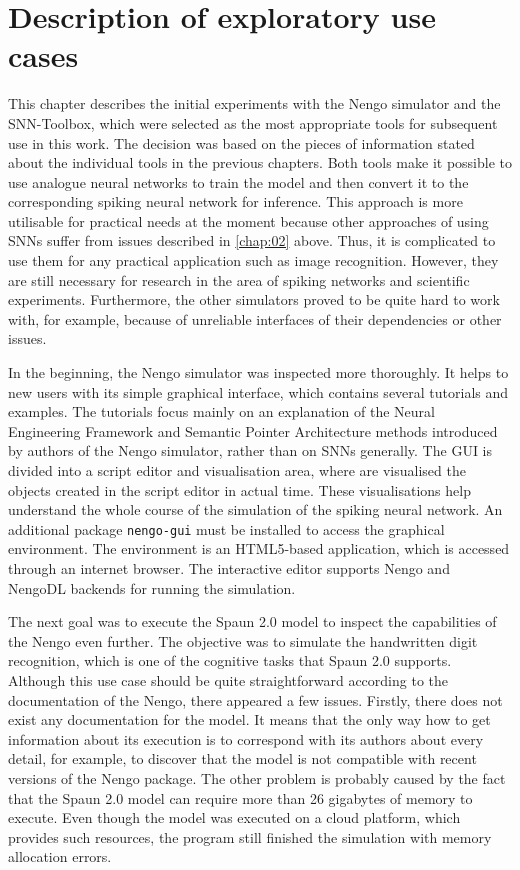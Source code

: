\chapter{Description of exploratory use cases} \label{chap:05}

This chapter describes the initial experiments with the Nengo simulator and the SNN-Toolbox, which were selected as the most appropriate tools for subsequent use in this work. The decision was based on the pieces of information stated about the individual tools in the previous chapters. Both tools make it possible to use analogue neural networks to train the model and then convert it to the corresponding spiking neural network for inference. This approach is more utilisable for practical needs at the moment because other approaches of using SNNs suffer from issues described in \cref{chap:02} above. Thus, it is complicated to use them for any practical application such as image recognition. However, they are still necessary for research in the area of spiking networks and scientific experiments. Furthermore, the other simulators proved to be quite hard to work with, for example, because of unreliable interfaces of their dependencies or other issues. \par
In the beginning, the Nengo simulator was inspected more thoroughly. It helps to new users with its simple graphical interface, which contains several tutorials and examples. The tutorials focus mainly on an explanation of the Neural Engineering Framework and Semantic Pointer Architecture methods introduced by authors of the Nengo simulator, rather than on SNNs generally. The GUI is divided into a script editor and visualisation area, where are visualised the objects created in the script editor in actual time. These visualisations help understand the whole course of the simulation of the spiking neural network. An additional package \texttt{nengo-gui} must be installed to access the graphical environment. The environment is an HTML5-based application, which is accessed through an internet browser. The interactive editor supports Nengo and NengoDL backends for running the simulation. \par
The next goal was to execute the Spaun 2.0 model to inspect the capabilities of the Nengo even further. The objective was to simulate the handwritten digit recognition, which is one of the cognitive tasks that Spaun 2.0 supports. Although this use case should be quite straightforward according to the documentation of the Nengo, there appeared a few issues. Firstly, there does not exist any documentation for the model. It means that the only way how to get information about its execution is to correspond with its authors about every detail, for example, to discover that the model is not compatible with recent versions of the Nengo package. The other problem is probably caused by the fact that the Spaun 2.0 model can require more than 26 gigabytes of memory to execute. Even though the model was executed on a cloud platform, which provides such resources, the program still finished the simulation with memory allocation errors.

